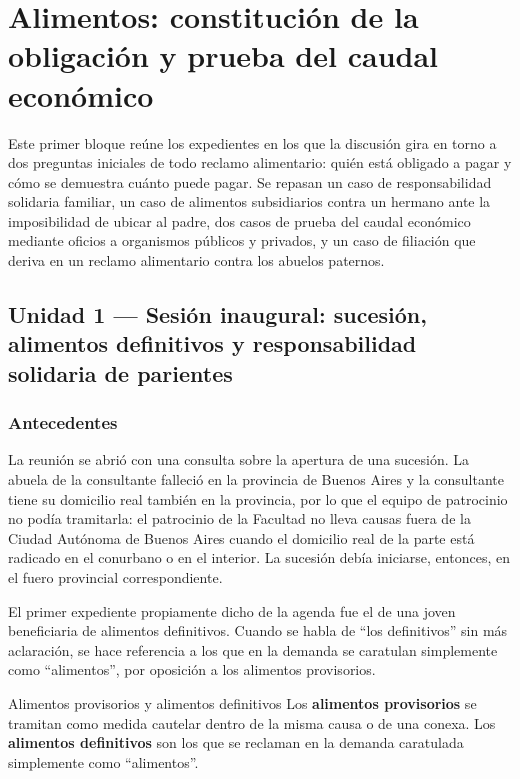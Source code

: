 \documentclass[12pt,oneside]{book}
\begin{document}
\chapter[Alimentos: constitución y prueba del caudal]{Alimentos: constitución de la obligación y prueba del caudal económico}

Este primer bloque reúne los expedientes en los que la discusión gira en torno a dos preguntas iniciales de todo reclamo alimentario: quién está obligado a pagar y cómo se demuestra cuánto puede pagar. Se repasan un caso de responsabilidad solidaria familiar, un caso de alimentos subsidiarios contra un hermano ante la imposibilidad de ubicar al padre, dos casos de prueba del caudal económico mediante oficios a organismos públicos y privados, y un caso de filiación que deriva en un reclamo alimentario contra los abuelos paternos.

\section{Unidad 1 --- Sesión inaugural: sucesión, alimentos definitivos y responsabilidad solidaria de parientes}

\subsection{Antecedentes}

La reunión se abrió con una consulta sobre la apertura de una sucesión. La abuela de la consultante falleció en la provincia de Buenos Aires y la consultante tiene su domicilio real también en la provincia, por lo que el equipo de patrocinio no podía tramitarla: el patrocinio de la Facultad no lleva causas fuera de la Ciudad Autónoma de Buenos Aires cuando el domicilio real de la parte está radicado en el conurbano o en el interior. La sucesión debía iniciarse, entonces, en el fuero provincial correspondiente.

El primer expediente propiamente dicho de la agenda fue el de una joven beneficiaria de alimentos definitivos. Cuando se habla de ``los definitivos'' sin más aclaración, se hace referencia a los que en la demanda se caratulan simplemente como ``alimentos'', por oposición a los alimentos provisorios.

\begin{definition}{Alimentos provisorios y alimentos definitivos}
Los \textbf{alimentos provisorios} se tramitan como medida cautelar dentro de la misma causa o de una conexa. Los \textbf{alimentos definitivos} son los que se reclaman en la demanda caratulada simplemente como ``alimentos''.
\end{definition}
\end{document}
